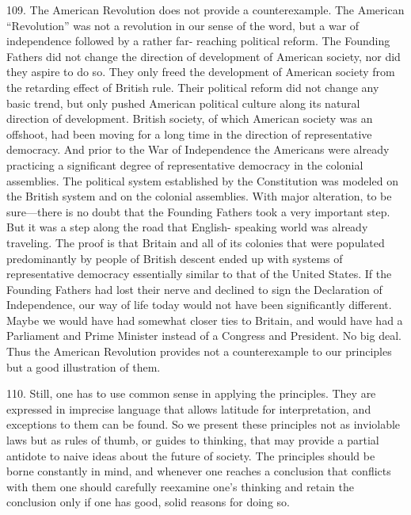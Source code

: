 \documentclass{article}
\begin{document}
109.  The American Revolution does not provide a counterexample.  The American “Revolution” 
was not a revolution in our sense of the word, but a war of independence followed by a rather far-
reaching political reform.  The Founding Fathers did not change the direction of development of 
American  society,  nor  did  they  aspire  to  do  so.   They  only  freed  the  development  of  American  
society from the retarding effect of British rule.  Their political reform did not change any basic 
trend, but only pushed American political culture along its natural direction of 
development.  British society, of which American society was an offshoot, had been moving for a 
long time in the direction of representative democracy.  And prior to the War of Independence the 
Americans were already practicing a significant degree of representative democracy in the colonial 
assemblies.   The  political  system  established  by  the  Constitution  was  modeled  on  the  British  
system and on the colonial assemblies.  With major alteration, to be sure—there is no doubt that 
the Founding Fathers took a very important step.  But it was a step along the road that English-
speaking world was already traveling.  The proof is that Britain and all of its colonies that were 
populated  predominantly  by  people  of  British  descent  ended  up  with  systems  of  representative  
democracy essentially similar to that of the United States.  If the Founding Fathers had lost their 
nerve and declined to sign the Declaration of Independence, our way of life today would not have 
been significantly different.  Maybe we would have had somewhat closer ties to Britain, and would 
have had a Parliament and Prime Minister instead of a Congress and President.  No big deal.  Thus 
the American Revolution provides not a counterexample to our principles but a good illustration 
of them. \vspace{\baselineskip} \newpage

110.  Still,  one  has  to  use  common  sense  in  applying  the  principles.   They  are  expressed  in  
imprecise language that allows latitude for interpretation, and exceptions to them can be found.  So 
we present these principles not as inviolable laws but as rules of thumb, or guides to thinking, that 
may provide a partial antidote to naive ideas about the future of society.  The principles should be 
borne  constantly  in  mind,  and  whenever  one  reaches  a  conclusion  that  conflicts  with  them  one  
should carefully reexamine one’s thinking  and retain the conclusion only if one has  good, solid 
reasons for doing so. 
\end{document}
